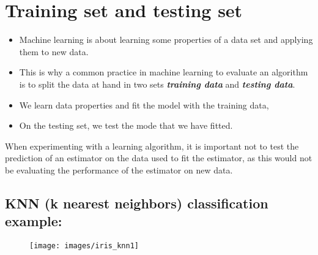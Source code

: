 \documentclass[SKL-MASTER.tex]{subfiles}
\begin{document}
\Large
\section*{Training set and testing set}

\begin{itemize}
\item Machine learning is about learning some properties of a data set and applying them to new data. \item This is why a
common practice in machine learning to evaluate an algorithm is to split the data at hand in two sets \textbf{\textit{training data}} and \textbf{\textit{testing data}}.
\end{itemize}

\begin{itemize}
\item We learn data properties and fit the model with the training data, 
\item On the testing set, we test  the mode that we have fitted.
\end{itemize} 

When experimenting with a learning algorithm, it is important not to test the prediction of an estimator on the data used to fit the estimator, as this would not be evaluating the performance of the estimator on new data.
\newpage
\subsection*{KNN (k nearest neighbors) classification example:}

\begin{figure}[h!]
\centering
\texttt{[image: images/iris\_knn1]}

\end{figure}
\end{document}
